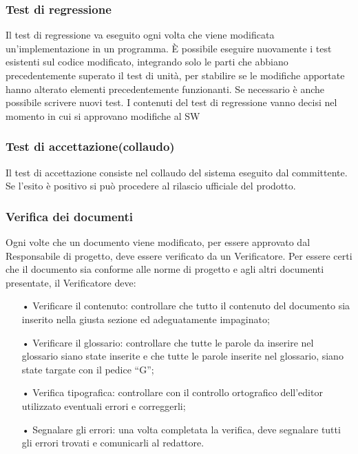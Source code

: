 \subsubsection{Test di regressione}
Il test di regressione va eseguito ogni volta che viene modificata un’implementazione in un programma. È possibile eseguire nuovamente i test esistenti sul codice modificato, integrando solo le parti che abbiano precedentemente superato il test di unità, per stabilire se le modifiche apportate hanno alterato elementi precedentemente funzionanti. Se necessario è anche possibile scrivere nuovi test. 
\newline
I contenuti del test di regressione vanno decisi nel momento in cui si approvano modifiche al SW

\subsubsection{Test di accettazione(collaudo)}
Il test di accettazione consiste nel collaudo del sistema eseguito dal committente. Se l’esito è positivo si può procedere al rilascio ufficiale del prodotto.

\subsubsection{Verifica dei documenti}
Ogni volte che un documento viene modificato, per essere approvato dal Responsabile di progetto, deve essere verificato da un Verificatore. 
\newline
Per essere certi che il documento sia conforme alle norme di progetto e agli altri documenti presentate, il Verificatore deve:
\begin{itemize}
\item[•] Verificare il contenuto: controllare che tutto il contenuto del documento sia inserito nella giusta sezione ed adeguatamente impaginato;
\item[•] Verificare il glossario: controllare che tutte le parole da inserire nel glossario siano state inserite e che tutte le parole inserite nel glossario, siano state targate con il pedice “G”;
\item[•] Verifica tipografica: controllare con il controllo ortografico dell’editor utilizzato eventuali errori e correggerli;
\item[•] Segnalare gli errori: una volta completata la verifica, deve segnalare tutti gli errori trovati e comunicarli al redattore.
\end{itemize}
